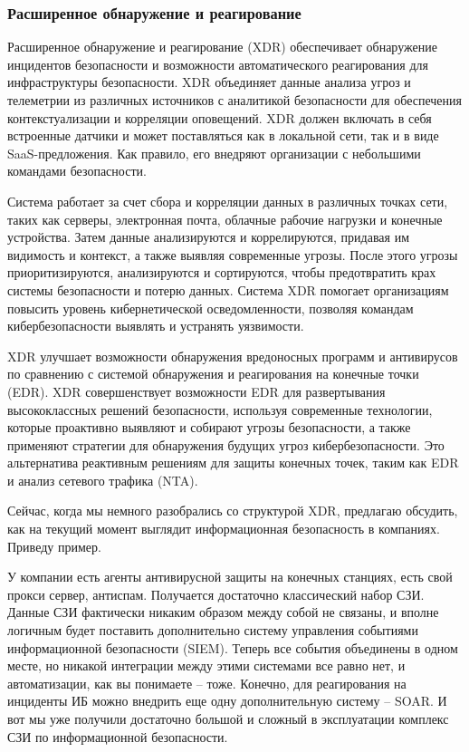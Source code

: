 \subsubsection{Расширенное обнаружение и реагирование}

Расширенное обнаружение и реагирование (XDR) обеспечивает обнаружение инцидентов безопасности и возможности автоматического реагирования для инфраструктуры безопасности. XDR объединяет данные анализа угроз и телеметрии из различных источников с аналитикой безопасности для обеспечения контекстуализации и корреляции оповещений. XDR должен включать в себя встроенные датчики и может поставляться как в локальной сети, так и в виде SaaS-предложения. Как правило, его внедряют организации с небольшими командами безопасности.

Система работает за счет сбора и корреляции данных в различных точках сети, таких как серверы, электронная почта, облачные рабочие нагрузки и конечные устройства. Затем данные анализируются и коррелируются, придавая им видимость и контекст, а также выявляя современные угрозы. После этого угрозы приоритизируются, анализируются и сортируются, чтобы предотвратить крах системы безопасности и потерю данных. Система XDR помогает организациям повысить уровень кибернетической осведомленности, позволяя командам кибербезопасности выявлять и устранять уязвимости.

XDR улучшает возможности обнаружения вредоносных программ и антивирусов по сравнению с системой обнаружения и реагирования на конечные точки (EDR). XDR совершенствует возможности EDR для развертывания высококлассных решений безопасности, используя современные технологии, которые проактивно выявляют и собирают угрозы безопасности, а также применяют стратегии для обнаружения будущих угроз кибербезопасности. Это альтернатива реактивным решениям для защиты конечных точек, таким как EDR и анализ сетевого трафика (NTA).

Сейчас, когда мы немного разобрались со структурой XDR, предлагаю обсудить, как на текущий момент выглядит информационная безопасность в компаниях. Приведу пример.

У компании есть агенты антивирусной защиты на конечных станциях, есть свой прокси сервер, антиспам. Получается достаточно классический набор СЗИ. Данные СЗИ фактически никаким образом между собой не связаны, и вполне логичным будет поставить дополнительно систему управления событиями информационной безопасности (SIEM). Теперь все события объединены в одном месте, но никакой интеграции между этими системами все равно нет, и автоматизации, как вы понимаете – тоже. Конечно, для реагирования на инциденты ИБ можно внедрить еще одну дополнительную систему – SOAR. И вот мы уже получили достаточно большой и сложный в эксплуатации комплекс СЗИ по информационной безопасности.

